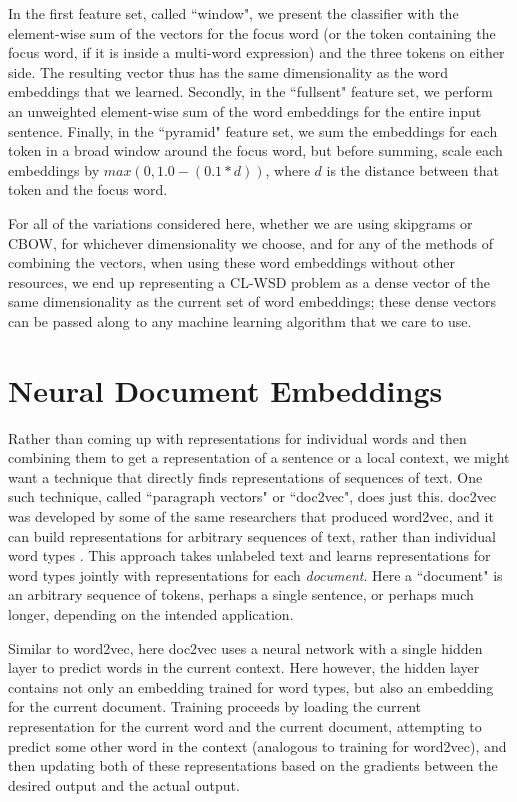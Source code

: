 In the first feature set, called ``window", we present the classifier with the
element-wise sum of the vectors for the focus word (or the token containing the
focus word, if it is inside a multi-word expression) and the three tokens on
either side. The resulting vector thus has the same dimensionality as the word
embeddings that we learned. Secondly, in the ``fullsent" feature set, we
perform an unweighted element-wise sum of the word embeddings for the entire
input sentence. Finally, in the ``pyramid" feature set, we sum the embeddings
for each token in a broad window around the focus word, but before summing,
scale each embeddings by $max(0, 1.0 - (0.1 * d))$, where $d$ is the distance
between that token and the focus word.

For all of the variations considered here, whether we are using skipgrams or
CBOW, for whichever dimensionality we choose, and for any of the methods of
combining the vectors, when using these word embeddings without other
resources, we end up representing a CL-WSD problem as a dense vector
of the same dimensionality as the current set of word embeddings;
these dense vectors can be passed along to any machine learning algorithm
that we care to use.

\section{Neural Document Embeddings}
Rather than coming up with representations for individual words and then
combining them to get a representation of a sentence or a local context, we
might want a technique that directly finds representations of sequences of
text. One such technique, called ``paragraph vectors" or ``doc2vec", does just
this. doc2vec was developed by some of the same researchers that produced
word2vec, and it can build representations for arbitrary sequences of text,
rather than individual word types
\cite{dai-document-embedding-2015,quocle-distributed-representations-2014}.
This approach takes unlabeled text and learns representations for word types
jointly with representations for each \emph{document}. Here a ``document" is an
arbitrary sequence of tokens, perhaps a single sentence, or perhaps much
longer, depending on the intended application.

Similar to word2vec, here doc2vec uses a neural network with a single hidden
layer to predict words in the current context. Here however, the hidden layer
contains not only an embedding trained for word types, but also an embedding
for the current document. Training proceeds by loading the current
representation for the current word and the current document, attempting to
predict some other word in the context (analogous to training for word2vec),
and then updating both of these representations based on the gradients between
the desired output and the actual output. 

